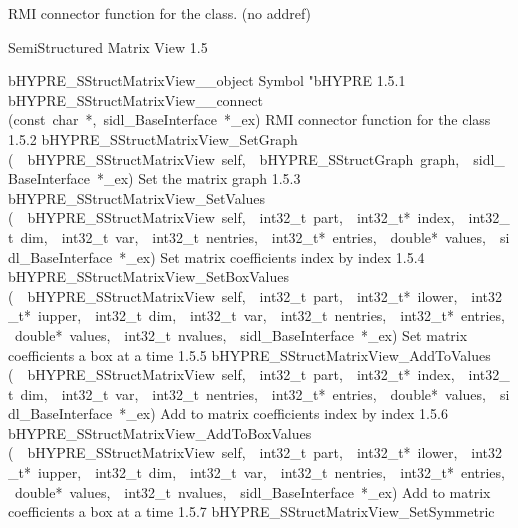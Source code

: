 \documentclass{article}
\begin{document}
\begin{cxxentry}
\begin{cxxentry}
\begin{cxxvariable}
\begin{cxxdoc}
RMI connector function for the class. (no addref)
\end{cxxdoc}
\end{cxxvariable}
\end{cxxentry}
\begin{cxxentry}
{}
        {SemiStructured Matrix View}
        {}
        {
}
        {1.5}
\begin{cxxnames}
        {bHYPRE\_SStructMatrixView\_\_object}
        {}
        {
Symbol "bHYPRE}
        {1.5.1}
        {bHYPRE\_SStructMatrixView\_\_connect}
        {(const\ char\ *,\ sidl\_BaseInterface\ *\_ex)}
        {
RMI connector function for the class}
        {1.5.2}
        {bHYPRE\_SStructMatrixView\_SetGraph}
        {(\ \ bHYPRE\_SStructMatrixView\ self,\ \ bHYPRE\_SStructGraph\ graph,\ \ sidl\_BaseInterface\ *\_ex)}
        {
Set the matrix graph}
        {1.5.3}
        {bHYPRE\_SStructMatrixView\_SetValues}
        {(\ \ bHYPRE\_SStructMatrixView\ self,\ \ int32\_t\ part,\ \ int32\_t*\ index,\ \ int32\_t\ dim,\ \ int32\_t\ var,\ \ int32\_t\ nentries,\ \ int32\_t*\ entries,\ \ double*\ values,\ \ sidl\_BaseInterface\ *\_ex)}
        {
Set matrix coefficients index by index}
        {1.5.4}
        {bHYPRE\_SStructMatrixView\_SetBoxValues}
        {(\ \ bHYPRE\_SStructMatrixView\ self,\ \ int32\_t\ part,\ \ int32\_t*\ ilower,\ \ int32\_t*\ iupper,\ \ int32\_t\ dim,\ \ int32\_t\ var,\ \ int32\_t\ nentries,\ \ int32\_t*\ entries,\ \ double*\ values,\ \ int32\_t\ nvalues,\ \ sidl\_BaseInterface\ *\_ex)}
        {
Set matrix coefficients a box at a time}
        {1.5.5}
        {bHYPRE\_SStructMatrixView\_AddToValues}
        {(\ \ bHYPRE\_SStructMatrixView\ self,\ \ int32\_t\ part,\ \ int32\_t*\ index,\ \ int32\_t\ dim,\ \ int32\_t\ var,\ \ int32\_t\ nentries,\ \ int32\_t*\ entries,\ \ double*\ values,\ \ sidl\_BaseInterface\ *\_ex)}
        {
Add to matrix coefficients index by index}
        {1.5.6}
        {bHYPRE\_SStructMatrixView\_AddToBoxValues}
        {(\ \ bHYPRE\_SStructMatrixView\ self,\ \ int32\_t\ part,\ \ int32\_t*\ ilower,\ \ int32\_t*\ iupper,\ \ int32\_t\ dim,\ \ int32\_t\ var,\ \ int32\_t\ nentries,\ \ int32\_t*\ entries,\ \ double*\ values,\ \ int32\_t\ nvalues,\ \ sidl\_BaseInterface\ *\_ex)}
        {
Add to matrix coefficients a box at a time}
        {1.5.7}
        {bHYPRE\_SStructMatrixView\_SetSymmetric}

\end{cxxnames}
\end{cxxentry}
\end{cxxentry}
\end{document}
